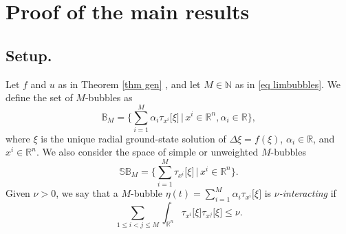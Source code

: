 \documentclass[11pt,letterpaper,reqno]{amsart}
\newcommand{\N}{\mathbb{N}}
\newcommand{\R}{\mathbb{R}}
\theoremstyle{plain}%
\theoremstyle{definition}
\numberwithin{equation}{section}
\numberwithin{figure}{section}
\begin{document}
\section{Proof of the main results}\label{sec proofmain}

\subsection{Setup.}\label{subsec setup} Let $f$ and $u$ as in Theorem \ref{thm gen} , and let $M\in \N$ as in \eqref{eq limbubbles}. We define the set of $M$-bubbles as 
$$\mathbb{B}_{M} = \Big\{\sum_{i=1}^M  \alpha_i\tau_{x^i}\big[\xi\big]\, \Big|\,  x^i \in \R^n, \alpha_i \in \R\Big\},$$
where $\xi$ is the unique radial ground-state solution of $\Delta \xi = f(\xi)$, $\alpha_i \in \R$, and $x^i \in \R^n$. We also consider the space of simple or unweighted $M$-bubbles 
$$\mathbb{SB}_{M} = \Big\{\sum_{i=1}^M  \tau_{x^i}\big[\xi\big]\, \Big|\,  x^i \in \R^n\Big\}.$$
Given $\nu >0$, we say that a $M$-bubble $\eta(t)=\sum_{i=1}^M  \alpha_i \tau_{x^i}\big[\xi\big]$ is \textit{$\nu$-interacting} if
	\begin{equation}\label{eq nuweak interation}
		\sum_{1\leq i< j \leq M}\int_{\R^n} \tau_{x^i}\big[\xi\big] \tau_{x^j}\big[\xi\big] \leq \nu.
	\end{equation}
\end{document}
